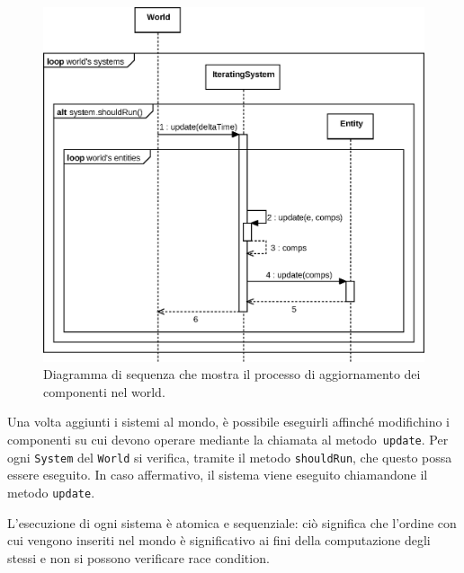 \begin{figure}[H]
    \centering
    \includegraphics[width=\textwidth]{./img/Sequence}
    \caption{Diagramma di sequenza che mostra il processo di aggiornamento dei componenti nel world.}\label{fig:sequence}
\end{figure}

Una volta aggiunti i sistemi al mondo, è possibile eseguirli affinché modifichino i componenti
su cui devono operare mediante la chiamata al metodo~\texttt{update}.
Per ogni \texttt{System} del \texttt{World} si verifica, tramite il metodo \texttt{shouldRun}, che questo possa essere
eseguito.
In caso affermativo, il sistema viene eseguito chiamandone il metodo \texttt{update}.

L'esecuzione di ogni sistema è atomica e sequenziale: ciò significa che l'ordine con cui vengono inseriti nel
mondo è significativo ai fini della computazione degli stessi e non si possono verificare race condition.
